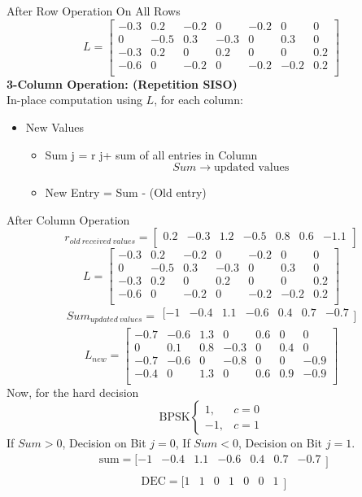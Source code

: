 After Row Operation On All Rows
\[ L=\left[\begin{matrix}-0.3&0.2&-0.2&0&-0.2&0&0\\0&-0.5&0.3&-0.3&0&0.3&0\\-0.3&0.2&0&0.2&0&0&0.2\\-0.6&0&-0.2&0&-0.2&-0.2&0.2\\\end{matrix}\right] \]
\textbf{3-Column Operation: (Repetition SISO)} \\
In-place computation using $L$, for each column:
\begin{itemize}
    \item New Values
    \begin{itemize}
        \item Sum j = r j+ sum of all entries in Column \[ Sum \rightarrow \text{updated values} \]
        \item New Entry = Sum - (Old entry)
    \end{itemize}
\end{itemize}
After Column Operation
\[ r_{old\ received\ values}=[\begin{matrix}0.2&-0.3&1.2&-0.5&0.8&0.6&-1.1\\\end{matrix}] \]
\[ L=\left[\begin{matrix}-0.3&0.2&-0.2&0&-0.2&0&0\\0&-0.5&0.3&-0.3&0&0.3&0\\-0.3&0.2&0&0.2&0&0&0.2\\-0.6&0&-0.2&0&-0.2&-0.2&0.2\\\end{matrix}\right] \]
\[ {Sum}_{updated\ values} = \begin{matrix} [-1&-0.4&1.1&-0.6&0.4&0.7&-0.7\\\end{matrix}] \]
\[ L_{new}=\left[\begin{matrix}-0.7&-0.6&1.3&0&0.6&0&0\\0&0.1&0.8&-0.3&0&0.4&0\\-0.7&-0.6&0&-0.8&0&0&-0.9\\-0.4&0&1.3&0&0.6&0.9&-0.9\\\end{matrix}\right] \]
Now, for the hard decision
\begin{equation*}
    \text{BPSK}
    \begin{cases}
        1, & c=0 \\
        -1, & c=1
    \end{cases}
\end{equation*}
If $Sum > 0$, Decision on Bit $j = 0$, If $Sum < 0$, Decision on Bit $j = 1$.
\[ \begin{matrix}\text{sum}=[-1&-0.4&1.1&-0.6&0.4&0.7&-0.7\\\end{matrix}] \]
\[ \begin{matrix}\text{DEC}=[1&1&0&1&0&0&1\\\end{matrix}] \]

